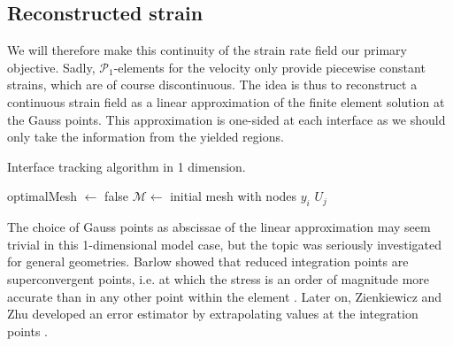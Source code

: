 \documentclass[11 pt]{report}
\begin{document}
\subsection{Reconstructed strain}

We will therefore make this continuity of the strain rate field our primary objective. Sadly, $\mathcal{P}_1$-elements for the velocity only provide piecewise constant strains, which are of course discontinuous. The idea is thus to reconstruct a continuous strain field as a linear approximation of the finite element solution at the Gauss points. This approximation is one-sided at each interface as we should only take the information from the yielded regions.

\begin{algorithm}[!b]
    \caption{Interface tracking algorithm in 1 dimension.}
    \label{alg:tacking_1d}
    optimalMesh $\gets$ false\;
    $\mathcal{M} \gets $ initial mesh with nodes $y_i$\;
    \Return $U_j$ 
\end{algorithm}

The choice of Gauss points as abscissae of the linear approximation may seem trivial in this 1-dimensional model case, but the topic was seriously investigated for general geometries. Barlow showed that reduced integration points are superconvergent points, i.e. at which the stress is an order of magnitude more accurate than in any other point within the element \cite{Barlow}. Later on, Zienkiewicz and Zhu developed an error estimator by extrapolating values at the integration points \cite{Zienkiewicz}.
\end{document}
